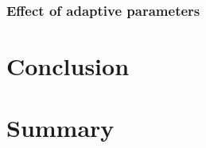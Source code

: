 \documentclass[
     11pt,         %
     a4paper,      %
     oneside,
     ]{article}
\begin{document}
\subsubsection{Effect of adaptive parameters}
\section{Conclusion}\label{sec:conclusion}

\section{Summary}

\newpage
{}


\end{document}
